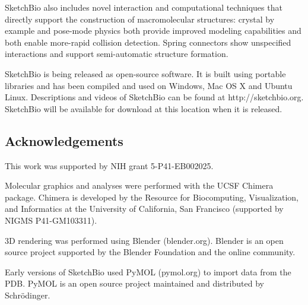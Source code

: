\documentclass[twocolumn]{bmcart}%
\begin{document}
SketchBio also includes novel interaction and computational techniques that directly support the construction of macromolecular structures: crystal by example and pose-mode physics both provide improved modeling capabilities and both enable more-rapid collision detection.
Spring connectors show unspecified interactions and support semi-automatic structure formation.

SketchBio is being released as open-source software.
It is built using portable libraries and has been compiled and used on Windows, Mac OS X and Ubuntu Linux.
Descriptions and videos of SketchBio can be found at http://sketchbio.org.
SketchBio will be available for download at this location when it is released.

\subsection*{Acknowledgements}
This work was supported by NIH grant 5-P41-EB002025.

Molecular graphics and analyses were performed with the UCSF Chimera package.
Chimera is developed by the Resource for Biocomputing, Visualization, and Informatics at the University of California, San Francisco (supported by NIGMS P41-GM103311).

3D rendering was performed using Blender (blender.org).
Blender is an open source project supported by the Blender Foundation and the online community.

Early versions of SketchBio used PyMOL (pymol.org) to import data from the PDB.
PyMOL is an open source project maintained and distributed by Schrödinger.

\end{document}
